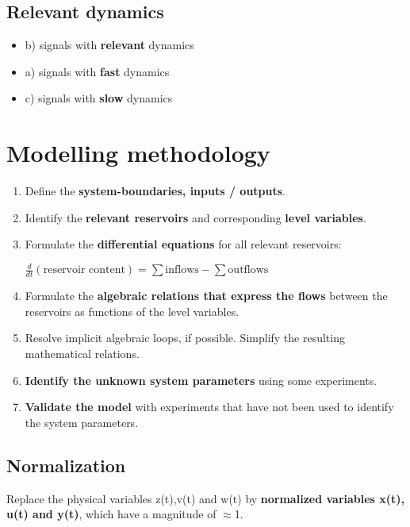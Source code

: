 \documentclass[10pt,a4paper]{scrartcl}
\begin{document}
\begin{multicols*}{3}
\columnbreak

\subsection{Relevant dynamics}


\begin{itemize}
\compaq
\item b) signals with \textbf{relevant} dynamics
\item a) signals with \textbf{fast} dynamics
\item c) signals with \textbf{slow} dynamics
\end{itemize}

\section{Modelling methodology}

\begin{enumerate}
\item Define the \textbf{system-boundaries, inputs / outputs}.
\item Identify the \textbf{relevant reservoirs} and corresponding \textbf{level variables}.

\item Formulate the \textbf{differential equations} for all relevant reservoirs:

$\frac{d}{dt}(\text{reservoir content})=\sum\text{inflows}-\sum\text{outflows}$
\item Formulate the \textbf{algebraic relations that express the flows} between the reservoirs as functions of the level variables.
\item Resolve implicit algebraic loops, if possible. Simplify the resulting mathematical relations.
\item \textbf{Identify the unknown system parameters} using some experiments.
\item \textbf{Validate the model} with experiments that have not been used to identify the system parameters.
\end{enumerate}

\newpage

\subsection{Normalization}
	Replace the physical variables z(t),v(t) and w(t) by \textbf{normalized variables x(t), u(t) and y(t)}, which have a magnitude of $\approx$1.
	

\end{multicols*}
\end{document}
